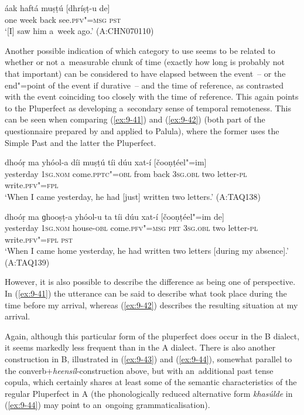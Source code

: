 \begin{exe}
\ex
\label{ex:9-40}
\gll áak haftá muṣṭú [dhríṣṭ-u de]  \\
one week back see.\textsc{pfv"=msg} \textsc{pst} \\
\glt `[I] saw him a~week ago.' (A:CHN070110)
\end{exe}

Another possible indication of which category to use seems to be related to whether or not a~measurable chunk of time (exactly how long is probably not that important) can be considered to have elapsed between the event~-- or the end"=point of the event if durative~-- and the time of reference, as contrasted with the event coinciding too closely with the time of reference. This again points to the Pluperfect as developing a~secondary sense of temporal remoteness. This can be seen when comparing (\ref{ex:9-41}) and (\ref{ex:9-42}) (both part of the questionnaire prepared by \citet{dahl1985} and applied to Palula), where the former uses the Simple Past and the latter the Pluperfect.

\begin{exe}
\ex
\label{ex:9-41}
\gll \label{bkm:Ref190742986}dhoóṛ ma yhóol-a díi muṣṭú tíi dúu xat-í [čooṇṭéel"=im] \\
yesterday 1\textsc{sg.nom} come.\textsc{pptc"=obl} from back \textsc{3sg.obl} two letter-\textsc{pl} write.\textsc{pfv"=fpl} \\
\glt `When I came yesterday, he had [just] written two letters.' (A:TAQ138)

\ex
\label{ex:9-42}
\gll dhoóṛ ma ɡhooṣṭ-a yhóol-u ta tíi dúu xat-í [čooṇṭéel"=im de] \\
yesterday 1\textsc{sg.nom} house-\textsc{obl} come.\textsc{pfv"=msg}  \textsc{prt} \textsc{3sg.obl} two letter-\textsc{pl} write.\textsc{pfv"=fpl} \textsc{pst} \\
\glt `When I came home yesterday, he had written two letters [during my absence].' (A:TAQ139)
\end{exe}

However, it is also possible to describe the difference as being one of perspective. In (\ref{ex:9-41}) the utterance can be said to describe what took place during the time before my arrival, whereas (\ref{ex:9-42}) describes the resulting situation at my arrival.


Again, although this particular form of the pluperfect does occur in the B dialect, it seems markedly less frequent than in the A dialect. There is also another construction in B, illustrated in (\ref{ex:9-43}) and (\ref{ex:9-44}), somewhat parallel to the converb+\textit{heensíl}-construction above, but with an~additional past tense copula, which certainly shares at least some of the semantic characteristics of the regular Pluperfect in A (the phonologically reduced alternative form \textit{khasúlde} in (\ref{ex:9-44}) may point to an~ongoing grammaticalisation).

